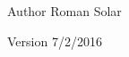 \begin{DoxyAuthor}{Author}
Roman Solar
\end{DoxyAuthor}
\begin{DoxyVersion}{Version}
7/2/2016 
\end{DoxyVersion}
